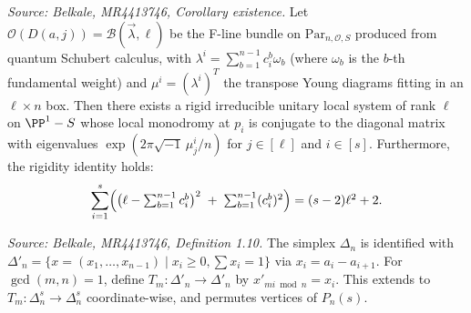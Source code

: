 \begin{corollary}[Existence]
  \label{cor:existence}
  \textit{Source: Belkale, MR4413746, Corollary existence.}
  Let \(\mathcal{O}(D(a,j)) = \mathcal{B}(\vec{\lambda}, \ell)\) be the F-line bundle on \(\mathrm{Par}_{n,\mathcal{O},S}\) produced from quantum Schubert calculus, with \(\lambda^i = \sum_{b=1}^{n-1} c^b_i \omega_b\) (where \(\omega_b\) is the \(b\)-th fundamental weight) and \(\mu^i = (\lambda^i)^T\) the transpose Young diagrams fitting in an \(\ell \times n\) box. Then there exists a rigid irreducible unitary local system of rank \(\ell\) on \(\PP^1 - S\) whose local monodromy at \(p_i\) is conjugate to the diagonal matrix with eigenvalues \(\exp(2\pi\sqrt{-1}\,\mu^i_j / n)\) for \(j \in [\ell]\) and \(i \in [s]\). Furthermore, the rigidity identity holds:
  \[
    \sum_{i=1}^s \Bigl( \bigl(\ell - \textstyle\sum_{b=1}^{n-1} c^b_i\bigr)^2 \;+\; \sum_{b=1}^{n-1} (c^b_i)^2 \Bigr) = (s-2)\ell^2 + 2.
  \]
\end{corollary}

\begin{definition}[SymmetryGroupAction]
  \label{def:t-m-map}
  \textit{Source: Belkale, MR4413746, Definition 1.10.}
  The simplex \(\Delta_n\) is identified with \(\Delta'_n = \{x = (x_1, \ldots, x_{n-1}) \mid x_i \geq 0, \sum x_i = 1\}\) via \(x_i = a_i - a_{i+1}\). For \(\gcd(m, n) = 1\), define \(T_m: \Delta'_n \to \Delta'_n\) by \(x'_{mi \bmod n} = x_i\). This extends to \(T_m: \Delta_n^s \to \Delta_n^s\) coordinate-wise, and permutes vertices of \(P_n(s)\).
\end{definition}

